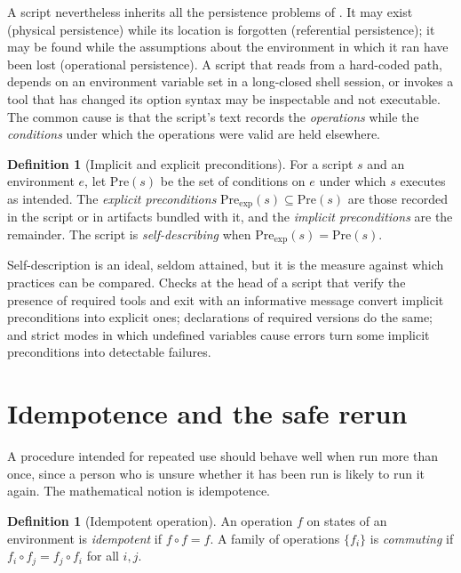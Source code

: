 \documentclass[11pt,twoside,openright]{book}
\theoremstyle{plain}
\theoremstyle{definition}
\newtheorem{definition}[theorem]{Definition}
\theoremstyle{remark}
\begin{document}
A script nevertheless inherits all the persistence problems of . It may exist (physical persistence) while its location is forgotten (referential persistence); it may be found while the assumptions about the environment in which it ran have been lost (operational persistence). A script that reads from a hard-coded path, depends on an environment variable set in a long-closed shell session, or invokes a tool that has changed its option syntax may be inspectable and not executable. The common cause is that the script's text records the \emph{operations} while the \emph{conditions} under which the operations were valid are held elsewhere.

\begin{definition}[Implicit and explicit preconditions]\label{def:precond}
For a script $s$ and an environment $e$, let $\mathrm{Pre}(s)$ be the set of conditions on $e$ under which $s$ executes as intended. The \emph{explicit preconditions} $\mathrm{Pre}_{\mathrm{exp}}(s)\subseteq\mathrm{Pre}(s)$ are those recorded in the script or in artifacts bundled with it, and the \emph{implicit preconditions} are the remainder. The script is \emph{self-describing} when $\mathrm{Pre}_{\mathrm{exp}}(s)=\mathrm{Pre}(s)$.
\end{definition}

Self-description is an ideal, seldom attained, but it is the measure against which practices can be compared. Checks at the head of a script that verify the presence of required tools and exit with an informative message convert implicit preconditions into explicit ones; declarations of required versions do the same; and strict modes in which undefined variables cause errors turn some implicit preconditions into detectable failures.

\section{Idempotence and the safe rerun}

A procedure intended for repeated use should behave well when run more than once, since a person who is unsure whether it has been run is likely to run it again. The mathematical notion is idempotence.

\begin{definition}[Idempotent operation]\label{def:idempotent}
An operation $f$ on states of an environment is \emph{idempotent} if $f\circ f=f$. A family of operations $\{f_i\}$ is \emph{commuting} if $f_i\circ f_j=f_j\circ f_i$ for all $i,j$.
\end{definition}
\end{document}
